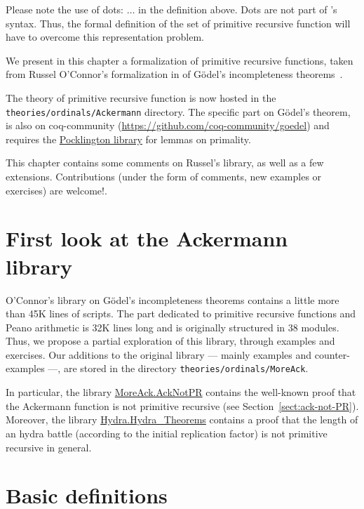 Please note the use of dots: $\ldots$ in the definition above. 
Dots are not part of \gallina's syntax. Thus, the formal definition of the set of primitive recursive function will have to overcome this representation problem.

  We present in this chapter a formalization of  primitive recursive functions, taken from  Russel O'Connor's formalization in \coq{} of
G\"odel's incompleteness theorems~\cite{OConnor05}.

\begin{remark}
 The theory of primitive recursive function is now hosted in
the \texttt{theories/ordinals/Ackermann} directory.
The specific part on G\"odel's theorem,  is also on
coq-community (\url{https://github.com/coq-community/goedel}) and requires the 
\href{https://github.com/coq-community/pocklington}{Pocklington library} for lemmas on primality.
\end{remark}

This chapter contains some comments on Russel's library, as well as a few extensions.
Contributions (under the form of comments, new examples or exercises) are welcome!. 



\section{First look at the Ackermann library}

O'Connor's library on Gödel's incompleteness theorems contains a little more 
than 45K lines of scripts. The part dedicated to primitive recursive functions and Peano arithmetic is 32K lines long and is originally structured in 38 modules.
Thus, we propose a partial exploration of this library, through examples and exercises. Our additions to the original library --- mainly examples and counter-examples ---,
are stored in the directory \texttt{theories/ordinals/MoreAck}.

In particular, the library \href{../theories/html/hydras.MoreAck.html}{MoreAck.AckNotPR} contains the well-known  proof that the Ackermann function is not primitive recursive (see Section~\vref{sect:ack-not-PR}).
Moreover, the library \href{../theories/html/hydras.Hydra_Theorems.html}{Hydra.Hydra\_Theorems} contains 
a proof that the length of an hydra battle (according to the initial replication factor) is not primitive recursive in general.

\section{Basic definitions}

